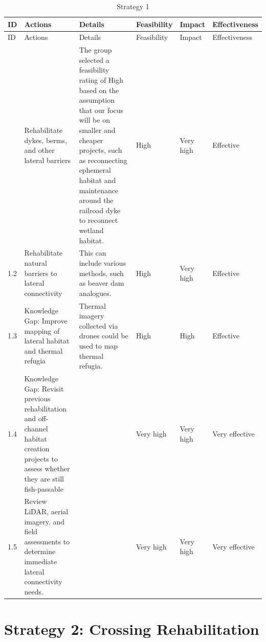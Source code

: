 \documentclass[
  letterpaper,
  DIV=11,
  numbers=noendperiod]{scrreprt}
\begin{document}

\hypertarget{tbl-S1}{}
\begin{longtable}[]{@{}llllll@{}}
\caption{\label{tbl-S1}Strategy 1}\label{T_1d885}\tabularnewline
\toprule\noalign{}
ID & Actions & Details & Feasibility & Impact & Effectiveness \\
\midrule\noalign{}
\endfirsthead
\toprule\noalign{}
ID & Actions & Details & Feasibility & Impact & Effectiveness \\
\midrule\noalign{}
\endhead
\bottomrule\noalign{}
\endlastfoot
1.1 & Rehabilitate dykes, berms, and other lateral barriers & The group
selected a feasibility rating of High based on the assumption that our
focus will be on smaller and cheaper projects, such as reconnecting
ephemeral habitat and maintenance around the railroad dyke to reconnect
wetland habitat. & High & Very high & Effective \\
1.2 & Rehabilitate natural barriers to lateral connectivity & This can
include various methods, such as beaver dam analogues. & High & Very
high & Effective \\
1.3 & Knowledge Gap: Improve mapping of lateral habitat and thermal
refugia & Thermal imagery collected via drones could be used to map
thermal refugia. & High & High & Effective \\
1.4 & Knowledge Gap: Revisit previous rehabilitation and off-channel
habitat creation projects to assess whether they are still fish-passable
& & Very high & Very high & Very effective \\
1.5 & Review LiDAR, aerial imagery, and field assessments to determine
immediate lateral connectivity needs. & & Very high & Very high & Very
effective \\
\end{longtable}

\hypertarget{strategy-2-crossing-rehabilitation}{%
\section*{Strategy 2: Crossing
Rehabilitation}\label{strategy-2-crossing-rehabilitation}}

\end{document}
